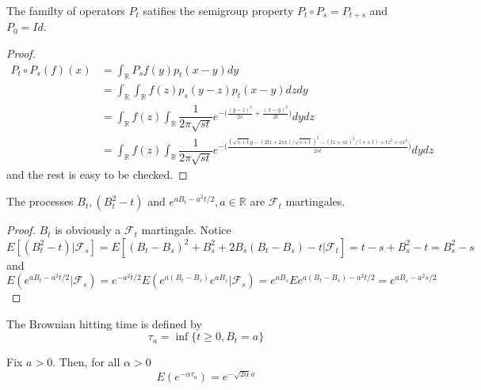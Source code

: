\documentclass[lang=en, color=blue, ]{elegantbook}
\newcommand{\F}{\mathcal{F}}
\newcommand{\R}{\mathbb{R}}
\begin{document}
\begin{proposition}
    The familty of operators $P_t$ satifies the semigroup property $P_t\circ P_s = P_{t+s}$ and $P_0 = Id$.
\end{proposition}
\begin{proof}
    \[
    \begin{aligned}
    P_t\circ P_s(f)(x) &= \int_{\R} P_sf(y)p_t(x-y)dy \\ & = \int_{\R} \int_{\R} f(z) p_s(y-z)p_t(x-y) dzdy \\
    & = \int_{\R} f(z) \int_{\R} \dfrac{1}{2\pi \sqrt{st}} e^{-\Big(\tfrac{(y-z)^2}{2s}+\tfrac{(x-y)^2}{2t}\Big)} dydz \\
    & = \int_{\R} f(z) \int_{\R} \dfrac{1}{2\pi \sqrt{st}} e^{-\Big(\tfrac{(\sqrt{s+t}y-(2tz+2sx)/\sqrt{s+t})^2-(tz+sx)^2/(s+t)+tz^2+sx^2}{2st}\Big)} dydz
    \end{aligned}
    \]
    and the rest is easy to be checked.
\end{proof}

\begin{theorem}
    The processes $B_t, (B_t^2-t)$ and $e^{aB_t-a^2t/2}, a\in\R$ are $\F_t$ martingales.
\end{theorem}

\begin{proof}
    $B_t$ is obviously a $\F_t$ martingale. Notice
    \[
    E[(B_t^2-t)|\F_s] = E[(B_t-B_s)^2+B_s^2+2B_s(B_t-B_s)-t|\F_t] = t-s+B_s^2-t = B_s^2 - s
    \]
    and
    \[
    E(e^{aB_t-a^2t/2}|\F_s) = e^{-a^2t/2}E(e^{a(B_t-B_s)}e^{aB_s}|\F_s) = e^{aB_s}Ee^{a(B_t-B_s)-a^2t/2} = e^{aB_s-a^2s/2}
    \]
\end{proof}

\begin{definition}
    The Brownian hitting time is defined by
    \[\tau_a = \inf\{t\geq 0, B_t = a\}\]
\end{definition}

\begin{proposition}
    Fix $a>0$. Then, for all $\alpha > 0$
    \[E(e^{-\alpha\tau_a}) = e^{-\sqrt{2\alpha}a}\]
\end{proposition}

\begin{theorem}
    
\end{theorem}
\end{document}

